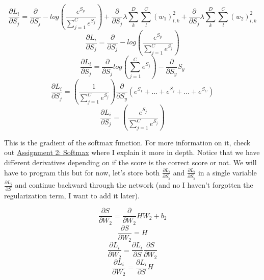 \documentclass[12pt]{article}
\begin{document}
\begin{equation}
    \frac{\partial L_i}{\partial S_j} =  \frac{\partial}{\partial S_j}
    - log(\frac{e^{S_y}}{{\sum_{j=1}^C} e^{S_j}}) + \frac{\partial}{\partial S_j}
    \lambda \sum_{k}^D \sum_{l}^C (w_1)_{l, k}^2 + \frac{\partial}{\partial S_j}
    \lambda \sum_{k}^D \sum_{l}^C (w_2)_{l, k}^2
\end{equation}
\begin{equation}
    \frac{\partial L_i}{\partial S_j} =  \frac{\partial}{\partial S_j}
    - log(\frac{e^{S_y}}{{\sum_{j=1}^C} e^{S_j}})
\end{equation}
\begin{equation}
    \frac{\partial L_i}{\partial S_j} =  \frac{\partial}{\partial S_j}
    log({\sum_{j=1}^C} e^{S_j}) - \frac{\partial}{\partial S_y} S_y
\end{equation}
\begin{equation}
    \frac{\partial L_i}{\partial S_j} =  (\frac{1}{\sum_{j=1}^C e^{S_j}})
    \frac{\partial}{\partial S_y} (e^{S_1} + ... + e^{S_j} + ... + e^{S_C})
\end{equation}
\begin{equation}
    \frac{\partial L_i}{\partial S_j} =  (\frac{e^{S_j}}{\sum_{j=1}^C e^{S_j}})
\end{equation}

This is the gradient of the softmax function. For more information on it, check out 
\href{https://github.com/bensmidt/EECS-498-DL-Computer-Vision/blob/main/A2/A2-Softmax.pdf}
{Assignment 2: Softmax} where I explain it more in depth. Notice that we have different derivatives 
depending on if the score is the correct score or not. We will have to program this but for now, 
let's store both $\frac{\partial L_i}{\partial S_y}$ and $\frac{\partial L_i}{\partial S_y}$ in a
single variable $\frac{\partial L_i}{\partial S}$ and continue backward through the network (and no 
I haven't forgotten the regularization term, I want to add it later).

\begin{equation}
    \frac{\partial S}{\partial W_2} = \frac{\partial }{\partial W_2} HW_2 + b_2
\end{equation}
\begin{equation}
    \frac{\partial S}{\partial W_2} = H
\end{equation}
\begin{equation}
    \frac{\partial L_i}{\partial W_2} = \frac{\partial L_i}{\partial S} \frac{\partial S}{\partial W_2}
\end{equation}
\begin{equation}
    \frac{\partial L_i}{\partial W_2} = \frac{\partial L_i}{\partial S} H
\end{equation}
\end{document}
